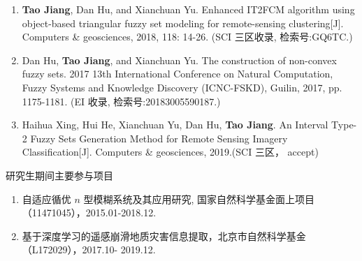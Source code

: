 \begin{paper}
\begin{enumerate}
  \item \textbf{Tao Jiang}, Dan Hu, and Xianchuan Yu.  Enhanced IT2FCM algorithm using object-based triangular fuzzy set modeling for remote-sensing clustering[J]. Computers \& geosciences, 2018, 118: 14-26. (SCI 三区收录, 检索号:GQ6TC.)
  \item Dan Hu, \textbf{Tao Jiang}, and Xianchuan Yu. The construction of non-convex fuzzy sets. 2017 13th International Conference on Natural Computation, Fuzzy Systems and Knowledge  Discovery (ICNC-FSKD), Guilin, 2017, pp. 1175-1181. (EI 收录, 检索号:20183005590187.)
  \item Haihua Xing, Hui He, Xianchuan Yu, Dan Hu, \textbf{Tao Jiang}.  An Interval Type-2 Fuzzy Sets Generation Method for Remote Sensing Imagery Classification[J]. Computers \& geosciences, 2019.(SCI 三区， accept)\\

  \end{enumerate}

\end{paper}





\begin{center}
  \large {\hei 研究生期间主要参与项目 }
\end{center}

\begin{enumerate}[(1)]
\item 自适应循优 $n$ 型模糊系统及其应用研究, 国家自然科学基金面上项目（11471045），2015.01-2018.12.

\item 基于深度学习的遥感崩滑地质灾害信息提取，北京市自然科学基金（L172029），2017.10-
2019.12.\\

\end{enumerate}

